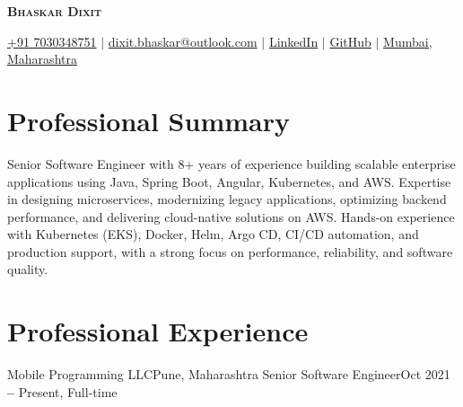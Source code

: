 \documentclass{resume}
\begin{document}

\begin{center}
    \textbf{\Huge \scshape Bhaskar Dixit} 

    \small
    \faMobile \hspace{.5pt} \href{tel:917030348751}{+91 7030348751}
    $|$
    \faAt \hspace{.5pt} \href{mailto:dixit.bhaskar@outlook.com}{dixit.bhaskar@outlook.com}
    $|$
    \faLinkedinSquare \hspace{.5pt} \href{https://www.linkedin.com/in/bhaskar-dixit}{LinkedIn}
    $|$
    \faGithub \hspace{.5pt} \href{https://github.com/devBhaskar98}{GitHub}
    $|$
    \faMapMarker \hspace{.5pt} \href{https://maps.app.goo.gl/cxQaZHjSpMqCGx5s9}{Mumbai, Maharashtra}
\end{center}

\section{Professional Summary}
{Senior Software Engineer with 8+ years of experience building scalable enterprise applications using Java, Spring Boot, Angular, Kubernetes, and AWS. Expertise in designing microservices, modernizing legacy applications, optimizing backend performance, and delivering cloud-native solutions on AWS. Hands-on experience with Kubernetes (EKS), Docker, Helm, Argo CD, CI/CD automation, and production support, with a strong focus on performance, reliability, and software quality.}

\section{Professional Experience}
\vspace{3pt}

    \resumeSubHeadingListStart
    \resumeSubheading
          {Mobile Programming LLC}{Pune, Maharashtra}
          {Senior Software Engineer}{Oct 2021 \textbf{--} Present, Full-time}
    
\end{document}

